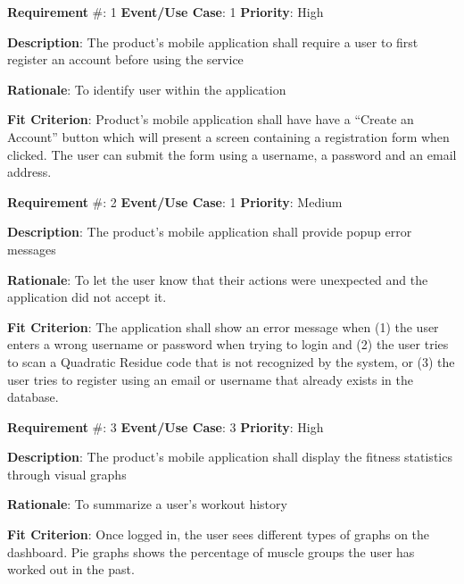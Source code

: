 \documentclass{article}
\newcommand\tab{\hspace*{2cm}}
\begin{document}






\textbf{Requirement} \#: 1 \tab \textbf{Event/Use Case}: 1
\tab \textbf{Priority}: High

\textbf{Description}: The product’s mobile application shall require a user to first register an account before using the service

\textbf{Rationale}: To identify user within the application

\textbf{Fit Criterion}: Product’s mobile application shall have have a “Create an Account” button which will present a screen containing a registration form when clicked. The user can submit the form using a username, a password and an email address.

\medskip

\textbf{Requirement} \#: 2 \tab \textbf{Event/Use Case}: 1
\tab \textbf{Priority}: Medium

\textbf{Description}: The product’s mobile application shall provide popup error messages

\textbf{Rationale}: To let the user know that their actions were unexpected and the application did not accept it.

\textbf{Fit Criterion}: The application shall show an error message when (1) the user enters a wrong username or password when trying to login and (2) the user tries to scan a Quadratic Residue code that is not recognized by the system, or (3) the user tries to register using an email or username that already exists in the database.

\medskip

\textbf{Requirement} \#: 3 \tab \textbf{Event/Use Case}: 3
\tab \textbf{Priority}: High

\textbf{Description}: The product’s mobile application shall display the fitness statistics through visual graphs

\textbf{Rationale}: To summarize a user’s workout history

\textbf{Fit Criterion}: Once logged in, the user sees different types of graphs on the dashboard. Pie graphs shows the percentage of muscle groups the user has worked out in the past. 
\end{document}
